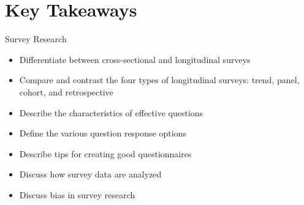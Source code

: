 \section{Key Takeaways}

\begin{center}
	\begin{tkawybox}{Survey Research}
		\begin{itemize}
			\setlength{\itemsep}{0pt}
			\setlength{\parskip}{0pt}
			\setlength{\parsep}{0pt}
			
			\item Differentiate between cross-sectional and longitudinal surveys
			\item Compare and contrast the four types of longitudinal surveys: trend, panel, cohort, and retrospective
			\item Describe the characteristics of effective questions
			\item Define the various question response options
			\item Describe tips for creating good questionnaires
			\item Discuss how survey data are analyzed
			\item Discuss bias in survey research

		\end{itemize}
	\end{tkawybox}
\end{center}
